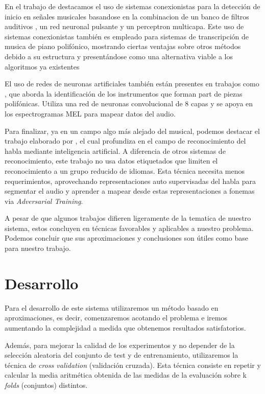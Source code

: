 \documentclass[12pt]{article}
\begin{document}
\bigskip
En el trabajo de \cite{marolt2002neural} destacamos el uso de sistemas conexionistas para la detección de inicio en señales musicales basandose en la combinacion de un banco de filtros auditivos
, un red neuronal pulsante y un perceptron multicapa. Este uso de sistemas conexionistas también es empleado para sistemas de transcripción de musica de piano polifónico, mostrando ciertas ventajas sobre otros métodos debido a su estructura y 
presentándose como una alternativa viable a los algoritmos ya existentes

\bigskip
El uso de redes de neuronas artificiales también están presentes en trabajos como \cite{solanki2019music}, que aborda la identificación de
los instrumentos que forman part de piezas polifónicas. Utiliza una red de neuronas convolucional de 8 capas y se apoya en los espectrogramas 
MEL para mapear datos del audio.

\bigskip
Para finalizar, ya en un campo algo más alejado del musical, podemos destacar el trabajo elaborado por \cite{baevski2021unsupervised},
el cual profundiza en el campo de reconocimiento del habla mediante inteligencia artificial.
A diferencia de otros sistemas de reconocimiento, este trabajo no usa datos etiquetados que limiten el reconocimiento a un grupo reducido de idiomas. 
Esta técnica necesita menos requerimientos, aprovechando representaciones auto supervisadas del habla para segmentar el audio y aprender a 
mapear desde estas representaciones a fonemas via \textit{Adversarial Training}.

\bigskip
A pesar de que algunos trabajos difieren ligeramente de la tematica de nuestro sistema, estos concluyen en técnicas favorables y aplicables a nuestro
 problema. Podemos concluir que sus aproximaciones y conclusiones son útiles como base para nuestro trabajo.

\bigskip

\newpage
\section{Desarrollo}
\label{Desarrollo}
Para el desarrollo de este sistema utilizaremos un método basado en aproximaciones, es decir, comenzaremos acotando el problema e iremos aumentando
la complejidad a medida que obtenemos resultados satisfatorios.

\bigskip
Además, para mejorar la calidad de los experimentos y no depender de la selección aleatoria del conjunto de test y de entrenamiento, utilizaremos
la técnica de \textit{cross validation} (validación cruzada). Esta técnica consiste en repetir y calcular la media aritmética obtenida de las medidas de la evaluación 
sobre k \textit{folds} (conjuntos) distintos.
\end{document}
